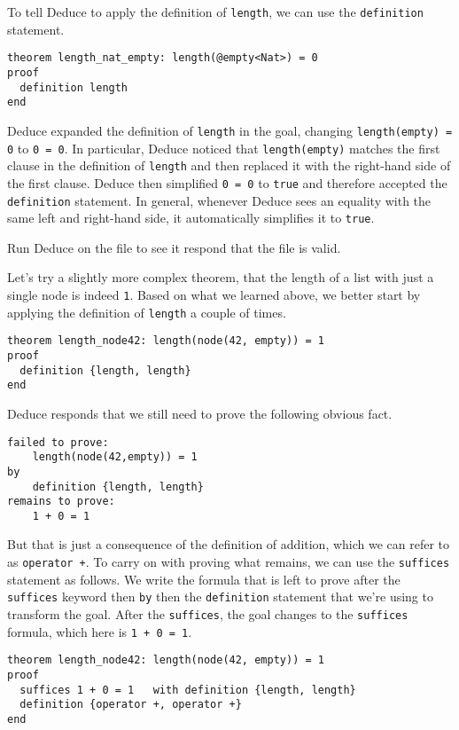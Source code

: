 \documentclass[12pt]{article}
\begin{document}
To tell Deduce to apply the definition of \texttt{length}, we can use
the \texttt{definition} statement.

\begin{verbatim}
theorem length_nat_empty: length(@empty<Nat>) = 0
proof
  definition length
end
\end{verbatim}

\noindent Deduce expanded the definition of \texttt{length} in the
goal, changing \texttt{length(empty) = 0} to \texttt{0 = 0}. In
particular, Deduce noticed that \texttt{length(empty)} matches the
first clause in the definition of \texttt{length} and then replaced it
with the right-hand side of the first clause. Deduce then simplified
\texttt{0 = 0} to \texttt{true} and therefore accepted the
\texttt{definition} statement. In general, whenever Deduce sees an
equality with the same left and right-hand side, it automatically
simplifies it to \texttt{true}.

Run Deduce on the file to see it respond that the file is valid.

Let's try a slightly more complex theorem, that the length
of a list with just a single node is indeed \texttt{1}. Based
on what we learned above, we better start by applying the
definition of \texttt{length} a couple of times.

\begin{verbatim}
theorem length_node42: length(node(42, empty)) = 1
proof
  definition {length, length}
end
\end{verbatim}

\noindent Deduce responds that we still need to prove the following
obvious fact.

\begin{verbatim}
failed to prove:
    length(node(42,empty)) = 1
by
    definition {length, length}
remains to prove:
    1 + 0 = 1
\end{verbatim}

\noindent But that is just a consequence of the definition of
addition, which we can refer to as \texttt{operator +}.  To carry on
with proving what remains, we can use the \texttt{suffices} statement
as follows. We write the formula that is left to prove after the
\texttt{suffices} keyword then \texttt{by} then the
\texttt{definition} statement that we're using to transform the goal.
After the \texttt{suffices}, the goal changes to the \texttt{suffices}
formula, which here is \texttt{1 + 0 = 1}.

\begin{verbatim}
theorem length_node42: length(node(42, empty)) = 1
proof
  suffices 1 + 0 = 1   with definition {length, length}
  definition {operator +, operator +}
end
\end{verbatim}
\end{document}
